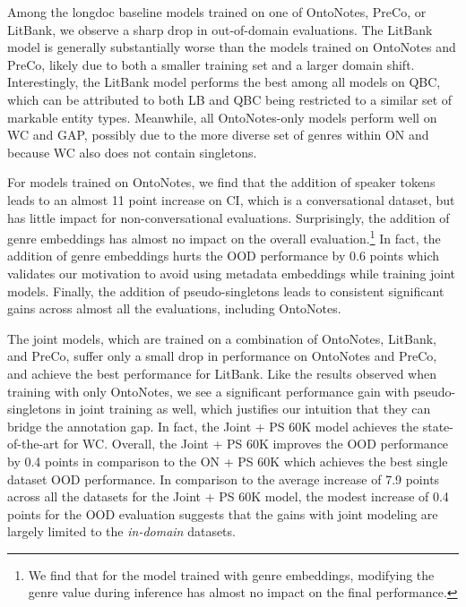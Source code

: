 \documentclass[12pt]{thesis-umich}[thesis]
\begin{document}
Among the longdoc baseline models trained on one of OntoNotes, PreCo, or LitBank, we observe a sharp drop in out-of-domain evaluations. 
The LitBank model is generally substantially worse than the models trained on OntoNotes and PreCo, likely due to both a smaller training set and a larger domain shift. Interestingly, the LitBank model performs the best among all models on QBC, which can be attributed to both LB and QBC being restricted to a similar set of markable entity types. 
Meanwhile, all OntoNotes-only models perform well on WC and GAP, possibly due to the more diverse set of genres within ON and because WC also does not contain singletons. 


For models trained on OntoNotes, we find that the addition of speaker tokens leads to an almost 11 point increase on CI, which is a conversational dataset, but has little impact for non-conversational evaluations.
Surprisingly, the addition of genre embeddings has almost no impact on the overall evaluation.\footnote{We find that for the model trained with genre embeddings, modifying the genre value during inference has almost no impact on the final performance.}
In fact, the addition of genre embeddings hurts the OOD performance by 0.6 points which validates our motivation to avoid using metadata embeddings while training joint models. 
Finally, the addition of pseudo-singletons leads to consistent  significant gains across almost all the evaluations, including OntoNotes. 


The joint models, which are trained on a combination of OntoNotes, LitBank, and PreCo, suffer only a small drop in performance on OntoNotes and PreCo, and achieve the best performance for LitBank. 
Like the results observed when training with only OntoNotes, we see a significant performance gain with pseudo-singletons in joint training as well, which justifies our intuition that they can bridge the annotation gap. 
In fact, the Joint + PS 60K model achieves the state-of-the-art for WC. 
Overall, the Joint + PS 60K improves the OOD performance by 0.4 points in comparison to the ON + PS 60K which achieves the best single dataset OOD performance. 
In comparison to the average increase of 7.9 points across all the datasets for the Joint + PS 60K model, the modest increase of 0.4 points for the OOD evaluation suggests that the gains with joint modeling are largely limited to the \emph{in-domain} datasets. 
\end{document}
